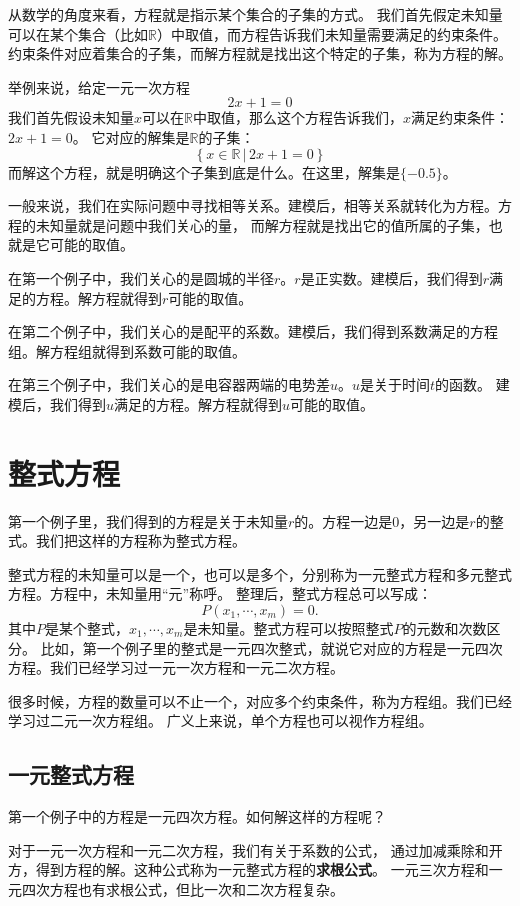 \documentclass[12pt,UTF8]{ctexbook}
\begin{document}
从数学的角度来看，方程就是指示某个集合的子集的方式。
我们首先假定未知量可以在某个集合（比如$\mathbb{R}$）中取值，而方程告诉我们未知量需要满足的约束条件。
约束条件对应着集合的子集，而解方程就是找出这个特定的子集，称为方程的解。

举例来说，给定一元一次方程
$$ 2x + 1 = 0$$
我们首先假设未知量$x$可以在$\mathbb{R}$中取值，那么这个方程告诉我们，$x$满足约束条件：$2x+1=0$。
它对应的解集是$\mathbb{R}$的子集：
$$ \left\{ x\in\mathbb{R} \, | \, 2x + 1 = 0 \right\} $$
而解这个方程，就是明确这个子集到底是什么。在这里，解集是$\{-0.5\}$。

一般来说，我们在实际问题中寻找相等关系。建模后，相等关系就转化为方程。方程的未知量就是问题中我们关心的量，
而解方程就是找出它的值所属的子集，也就是它可能的取值。

在第一个例子中，我们关心的是圆城的半径$r$。$r$是正实数。建模后，我们得到$r$满足的方程。解方程就得到$r$可能的取值。

在第二个例子中，我们关心的是配平的系数。建模后，我们得到系数满足的方程组。解方程组就得到系数可能的取值。

在第三个例子中，我们关心的是电容器两端的电势差$u$。$u$是关于时间$t$的函数。
建模后，我们得到$u$满足的方程。解方程就得到$u$可能的取值。

\section{整式方程}

第一个例子里，我们得到的方程是关于未知量$r$的。方程一边是$0$，另一边是$r$的整式。我们把这样的方程称为整式方程。

整式方程的未知量可以是一个，也可以是多个，分别称为一元整式方程和多元整式方程。方程中，未知量用“元”称呼。
整理后，整式方程总可以写成：
$$ P(x_1, \cdots ,x_m) = 0.$$
其中$P$是某个整式，$x_1, \cdots ,x_m$是未知量。整式方程可以按照整式$P$的元数和次数区分。
比如，第一个例子里的整式是一元四次整式，就说它对应的方程是一元四次方程。我们已经学习过一元一次方程和一元二次方程。

很多时候，方程的数量可以不止一个，对应多个约束条件，称为方程组。我们已经学习过二元一次方程组。
广义上来说，单个方程也可以视作方程组。

\subsection{一元整式方程}

第一个例子中的方程是一元四次方程。如何解这样的方程呢？

对于一元一次方程和一元二次方程，我们有关于系数的公式，
通过加减乘除和开方，得到方程的解。这种公式称为一元整式方程的\textbf{求根公式}。
一元三次方程和一元四次方程也有求根公式，但比一次和二次方程复杂。
\end{document}
